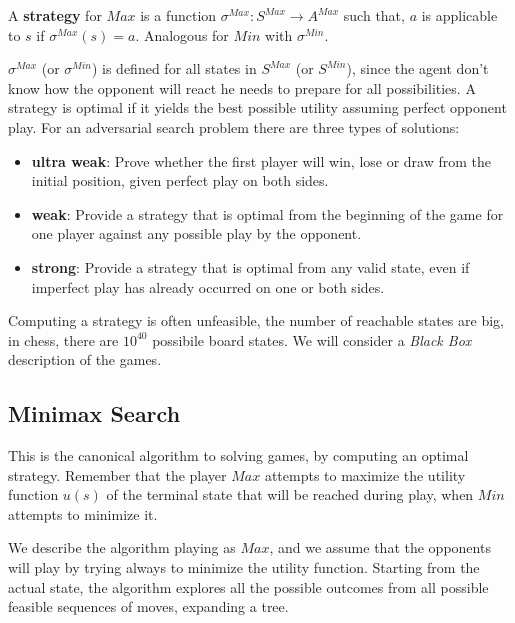 \documentclass[10pt, letterpaper]{report}
\begin{document}
\begin{definition}
    A \textbf{strategy} for $Max$ is a function $\sigma^{Max}:S^{Max}\rightarrow A^{Max}$ such that, $a$ is applicable to $s$ if $\sigma^{Max}(s)=a$. Analogous for $Min$ with $\sigma^{Min}$.
\end{definition}
$\sigma^{Max}$ (or $\sigma^{Min}$) is defined for all states in $S^{Max}$ (or $S^{Min}$), since the agent don't know how the opponent will react he needs to prepare for all
possibilities. A strategy is optimal if it yields the best possible utility assuming
perfect opponent play. For an adversarial search problem there are three types of solutions:\begin{itemize}
    \item \textbf{ultra weak}: Prove whether the first player will win, lose or draw from the
initial position, given perfect play on both sides.
\item \textbf{weak}: Provide a strategy that is optimal from the beginning of the game
for one player against any possible play by the opponent.
\item\textbf{strong}: Provide a strategy that is optimal from any valid state, even if
imperfect play has already occurred on one or both sides.
\end{itemize}
Computing a strategy is often unfeasible, the number of reachable states are big, in chess, there are $10^{40}$ possibile board states. We will consider a \textit{Black Box} description of the games.
\subsection{Minimax Search}
This is the canonical algorithm to solving games, by computing an optimal strategy. Remember that the player $Max$ attempts to maximize the utility function $u(s)$ of the terminal state that will be reached during play, when $Min$ attempts to minimize it.\bigskip 

We describe the algorithm playing as $Max$, and we assume that the opponents will play by trying always to minimize the utility function. Starting from the actual state, the algorithm explores all the possible outcomes from all possible feasible sequences of moves, expanding a tree.
\end{document}
